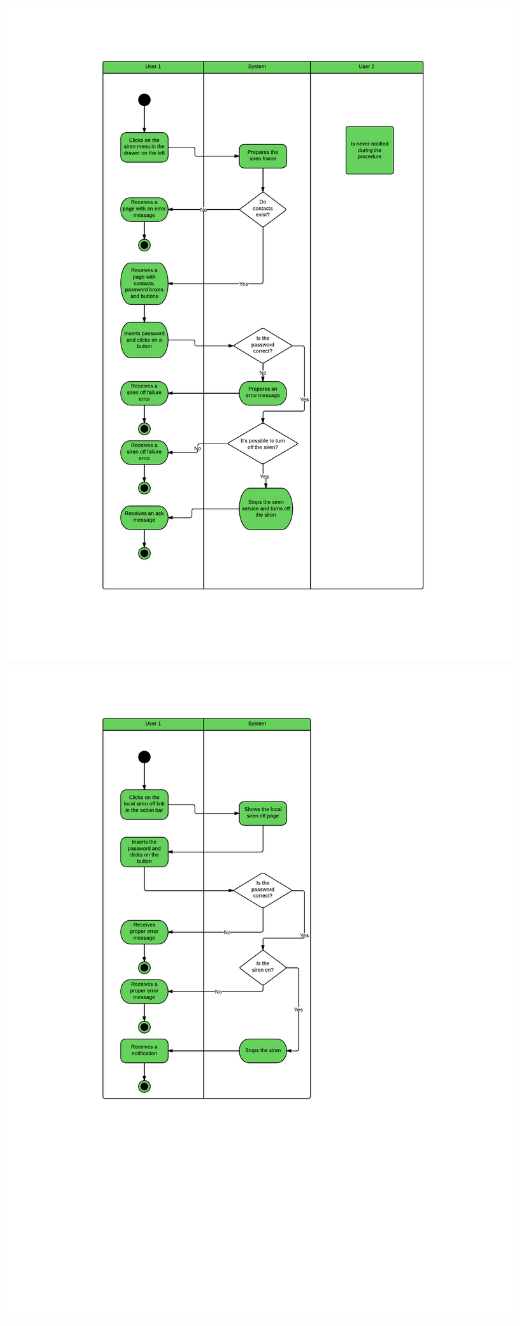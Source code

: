 \includegraphics[scale=0.7]{images/SirenOff}
\newpage
\includegraphics[scale=0.7]{images/localsirenoff}

